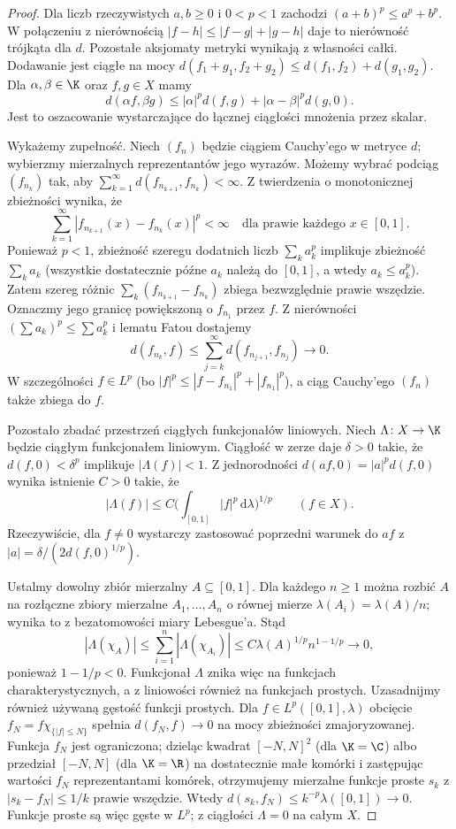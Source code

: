 \begin{proof}
Dla liczb rzeczywistych $a,b\geq0$ i $0<p<1$ zachodzi
$(a+b)^p\leq a^p+b^p$. W połączeniu z nierównością
$|f-h|\leq|f-g|+|g-h|$ daje to nierówność trójkąta dla $d$.
Pozostałe aksjomaty metryki wynikają z własności całki.
Dodawanie jest ciągłe na mocy
$d(f_1+g_1,f_2+g_2)\leq d(f_1,f_2)+d(g_1,g_2)$.
Dla $\alpha,\beta\in\K$ oraz $f,g\in X$ mamy
\[
 d(\alpha f,\beta g)
 \leq |\alpha|^p d(f,g)+|\alpha-\beta|^p d(g,0).
\]
Jest to oszacowanie wystarczające do łącznej ciągłości
mnożenia przez skalar.

Wykażemy zupełność. Niech $(f_n)$ będzie ciągiem Cauchy'ego
w metryce $d$; wybierzmy mierzalnych reprezentantów jego wyrazów.
Możemy wybrać podciąg $(f_{n_k})$ tak, aby
$\sum_{k=1}^\infty d(f_{n_{k+1}},f_{n_k})<\infty$.
Z twierdzenia o monotonicznej zbieżności wynika, że
\[
 \sum_{k=1}^\infty|f_{n_{k+1}}(x)-f_{n_k}(x)|^p<\infty
 \quad\text{dla prawie każdego }x\in[0,1].
\]
Ponieważ $p<1$, zbieżność szeregu dodatnich liczb
$\sum_k a_k^p$ implikuje zbieżność $\sum_k a_k$
(wszystkie dostatecznie późne $a_k$ należą do $[0,1]$,
a wtedy $a_k\leq a_k^p$). Zatem szereg różnic
$\sum_k(f_{n_{k+1}}-f_{n_k})$ zbiega bezwzględnie
prawie wszędzie. Oznaczmy jego granicę powiększoną o
$f_{n_1}$ przez $f$. Z nierówności $(\sum a_k)^p\leq\sum a_k^p$
i lematu Fatou dostajemy
\[
 d(f_{n_k},f)
 \leq \sum_{j=k}^\infty d(f_{n_{j+1}},f_{n_j})\longrightarrow0.
\]
W szczególności $f\in L^p$ (bo $|f|^p\leq|f-f_{n_1}|^p+|f_{n_1}|^p$),
a ciąg Cauchy'ego $(f_n)$ także zbiega do $f$.

Pozostało zbadać przestrzeń ciągłych funkcjonałów liniowych. Niech
$\Lambda\colon X\to\K$
będzie ciągłym funkcjonałem liniowym. Ciągłość w zerze
daje $\delta>0$ takie, że
$d(f,0)<\delta^p$ implikuje $|\Lambda(f)|<1$.
Z jednorodności $d(af,0)=|a|^p d(f,0)$ wynika istnienie
$C>0$ takie, że
\[
 |\Lambda(f)|\leq C\Big(\int_{[0,1]}|f|^p\,\mathrm d\lambda\Big)^{1/p}
 \qquad(f\in X).
\]
Rzeczywiście, dla $f\ne0$ wystarczy zastosować poprzedni
warunek do $a f$ z $|a|=\delta/(2d(f,0)^{1/p})$.

Ustalmy dowolny zbiór mierzalny $A\subseteq[0,1]$.
Dla każdego $n\geq1$ można rozbić $A$ na rozłączne
zbiory mierzalne $A_1,\ldots,A_n$ o równej mierze
$\lambda(A_i)=\lambda(A)/n$; wynika to z bezatomowości
miary Lebesgue'a. Stąd
\[
 |\Lambda(\chi_A)|
 \leq\sum_{i=1}^n|\Lambda(\chi_{A_i})|
 \leq C\lambda(A)^{1/p}n^{1-1/p}\longrightarrow0,
\]
ponieważ $1-1/p<0$. Funkcjonał $\Lambda$ znika więc
na funkcjach charakterystycznych, a z liniowości również
na funkcjach prostych. Uzasadnijmy również używaną gęstość funkcji prostych.
Dla $f\in L^p([0,1],\lambda)$ obcięcie
$f_N=f\chi_{\{|f|\leq N\}}$ spełnia
$d(f_N,f)\to0$ na mocy zbieżności zmajoryzowanej.
Funkcja $f_N$ jest ograniczona; dzieląc kwadrat
$[-N,N]^2$ (dla $\K=\C$) albo przedział $[-N,N]$
(dla $\K=\R$) na dostatecznie małe komórki i zastępując
wartości $f_N$ reprezentantami komórek, otrzymujemy
mierzalne funkcje proste $s_k$ z
$|s_k-f_N|\leq1/k$ prawie wszędzie. Wtedy
$d(s_k,f_N)\leq k^{-p}\lambda([0,1])\to0$.
Funkcje proste są więc gęste w $L^p$; z ciągłości
$\Lambda=0$ na całym $X$.
\end{proof}

